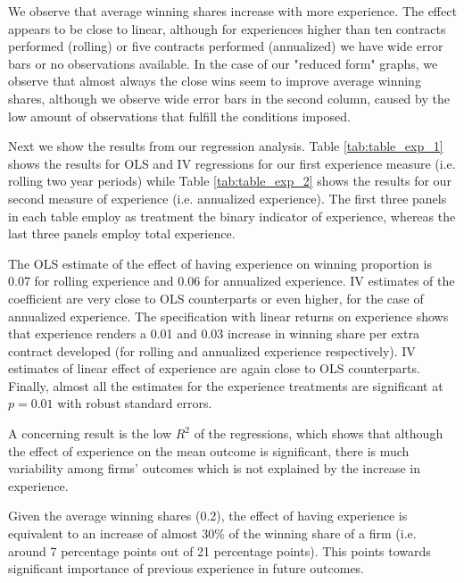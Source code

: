 We observe that average winning shares increase with more experience. The effect appears to be close to linear, although for experiences higher than ten contracts performed (rolling) or five contracts performed (annualized) we have wide error bars or no observations available. In the case of our "reduced form" graphs, we observe that almost always the close wins seem to improve average winning shares, although we observe wide error bars in the second column, caused by the low amount of observations that fulfill the conditions imposed.

Next we show the results from our regression analysis. Table \ref{tab:table_exp_1} shows the results for OLS and IV regressions for our first experience measure (i.e. rolling two year periods) while Table \ref{tab:table_exp_2} shows the results for our second measure of experience (i.e. annualized experience). The first three panels in each table employ as treatment the binary indicator of experience, whereas the last three panels employ total experience.

The OLS estimate of the effect of having experience on winning proportion is 0.07 for rolling experience and 0.06 for annualized experience. IV estimates of the coefficient are very close to OLS counterparts or even higher, for the case of annualized experience. The specification with linear returns on experience shows that experience renders a 0.01 and 0.03 increase in winning share per extra contract developed (for rolling and annualized experience respectively). IV estimates of linear effect of experience are again close to OLS counterparts. Finally, almost all the estimates for the experience treatments are significant at $p=0.01$ with robust standard errors.

A concerning result is the low $R^2$ of the regressions, which shows that although the effect of experience on the mean outcome is significant, there is much variability among firms' outcomes which is not explained by the increase in experience.

Given the average winning shares (0.2), the effect of having experience is equivalent to an increase of almost 30\% of the winning share of a firm (i.e. around 7 percentage points out of 21 percentage points). This points towards significant importance of previous experience in future outcomes.


